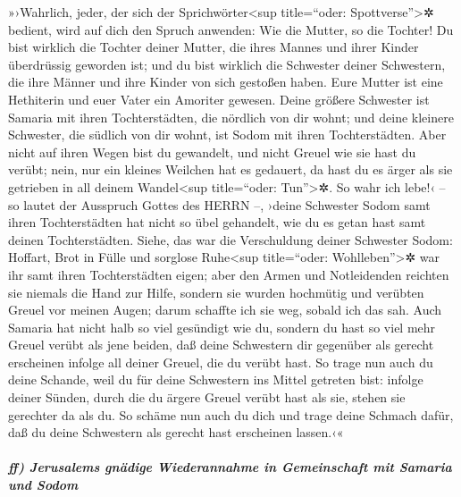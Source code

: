»›Wahrlich, jeder, der sich der Sprichwörter\textless sup
title=``oder: Spottverse''\textgreater✲ bedient, wird auf dich den
Spruch anwenden: Wie die Mutter, so die Tochter! Du bist
wirklich die Tochter deiner Mutter, die ihres Mannes und ihrer Kinder
überdrüssig geworden ist; und du bist wirklich die Schwester deiner
Schwestern, die ihre Männer und ihre Kinder von sich gestoßen haben.
Eure Mutter ist eine Hethiterin und euer Vater ein Amoriter gewesen.
Deine größere Schwester ist Samaria mit ihren
Tochterstädten, die nördlich von dir wohnt; und deine kleinere
Schwester, die südlich von dir wohnt, ist Sodom mit ihren
Tochterstädten. Aber nicht auf ihren Wegen bist du
gewandelt, und nicht Greuel wie sie hast du verübt; nein, nur ein
kleines Weilchen hat es gedauert, da hast du es ärger als sie getrieben
in all deinem Wandel\textless sup title=``oder: Tun''\textgreater✲.
So wahr ich lebe!‹ -- so lautet der Ausspruch Gottes des
HERRN --, ›deine Schwester Sodom samt ihren Tochterstädten hat nicht so
übel gehandelt, wie du es getan hast samt deinen Tochterstädten.
Siehe, das war die Verschuldung deiner Schwester Sodom:
Hoffart, Brot in Fülle und sorglose Ruhe\textless sup title=``oder:
Wohlleben''\textgreater✲ war ihr samt ihren Tochterstädten eigen; aber
den Armen und Notleidenden reichten sie niemals die Hand zur Hilfe,
sondern sie wurden hochmütig und verübten Greuel vor
meinen Augen; darum schaffte ich sie weg, sobald ich das sah.
Auch Samaria hat nicht halb so viel gesündigt wie du,
sondern du hast so viel mehr Greuel verübt als jene beiden, daß deine
Schwestern dir gegenüber als gerecht erscheinen infolge all deiner
Greuel, die du verübt hast. So trage nun auch du deine
Schande, weil du für deine Schwestern ins Mittel getreten bist: infolge
deiner Sünden, durch die du ärgere Greuel verübt hast als sie, stehen
sie gerechter da als du. So schäme nun auch du dich und trage deine
Schmach dafür, daß du deine Schwestern als gerecht hast erscheinen
lassen.‹«

\hypertarget{ff-jerusalems-gnuxe4dige-wiederannahme-in-gemeinschaft-mit-samaria-und-sodom}{%
\subparagraph{ff) Jerusalems gnädige Wiederannahme in Gemeinschaft mit
Samaria und
Sodom}\label{ff-jerusalems-gnuxe4dige-wiederannahme-in-gemeinschaft-mit-samaria-und-sodom}}

